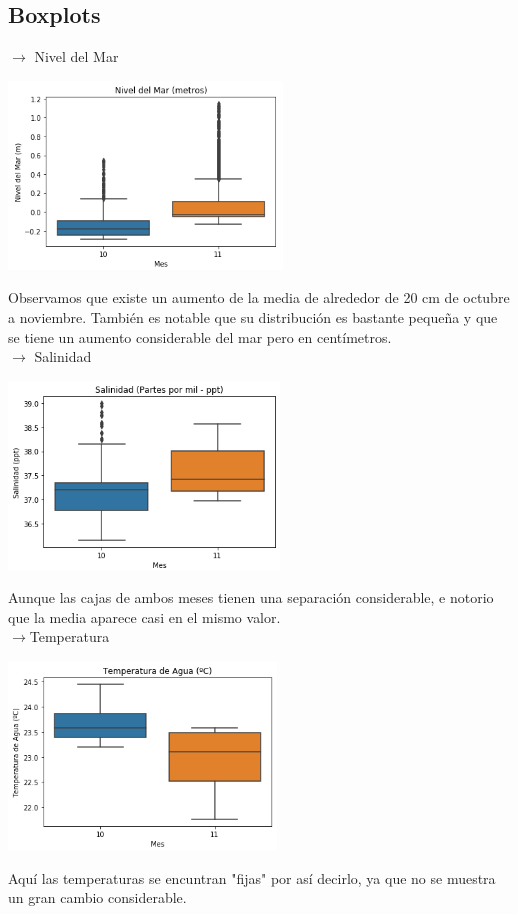 \documentclass[12pt]{article}
\begin{document}
\subsection*{Boxplots}
$\rightarrow$ Nivel del Mar
\begin{center}
	\includegraphics[height=5cm]{gb1.png}
\end{center}
Observamos que existe un aumento de la media de alrededor de 20 cm de octubre a noviembre. También es notable que su distribución es bastante pequeña y que se tiene un aumento considerable del mar pero en centímetros.\\
\newpage
$\rightarrow$ Salinidad
\begin{center}
	\includegraphics[height=5cm]{gb2.png}
\end{center}
Aunque las cajas de ambos meses tienen una separación considerable, e notorio que la media aparece casi en el mismo valor.\\

$\rightarrow$Temperatura
\begin{center}
	\includegraphics[height=5cm]{gb3.png}
\end{center}
Aquí las temperaturas se encuntran "fijas" por así decirlo, ya que no se muestra un gran cambio considerable.
\end{document}
